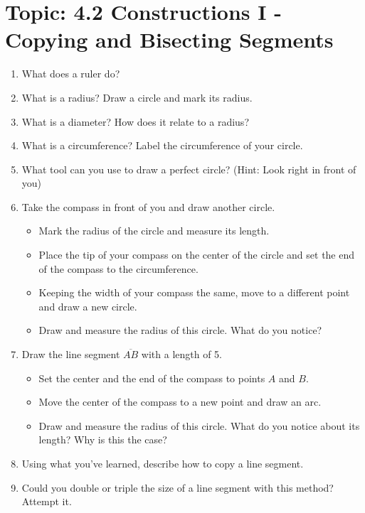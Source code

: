 \documentclass[12pt,letterpaper]{article}
\begin{document}
\newpage
\section*{Topic: 4.2 Constructions I - Copying and Bisecting Segments}
\begin{enumerate}
    \item What does a ruler do?
    \item What is a radius? Draw a circle and mark its radius.
    \item What is a diameter? How does it relate to a radius?
    \item What is a circumference? Label the circumference of your circle.
    \item What tool can you use to draw a perfect circle? (Hint: Look right in front of you)
    \item Take the compass in front of you and draw another circle.
          \begin{itemize}
              \item Mark the radius of the circle and measure its length.
              \item Place the tip of your compass on the center of the circle and set the end of the compass to the circumference.
              \item Keeping the width of your compass the same, move to a different point and draw a new circle.
              \item Draw and measure the radius of this circle. What do you notice?
          \end{itemize}
    \item Draw the line segment $\overline{AB}$ with a length of 5.
          \begin{itemize}
              \item Set the center and the end of the compass to points $A$ and $B$.
              \item Move the center of the compass to a new point and draw an arc.
              \item Draw and measure the radius of this circle. What do you notice about its length? Why is this the case?
          \end{itemize}
    \item Using what you've learned, describe how to copy a line segment.
    \item Could you double or triple the size of a line segment with this method? Attempt it.
\end{enumerate}
\end{document}
